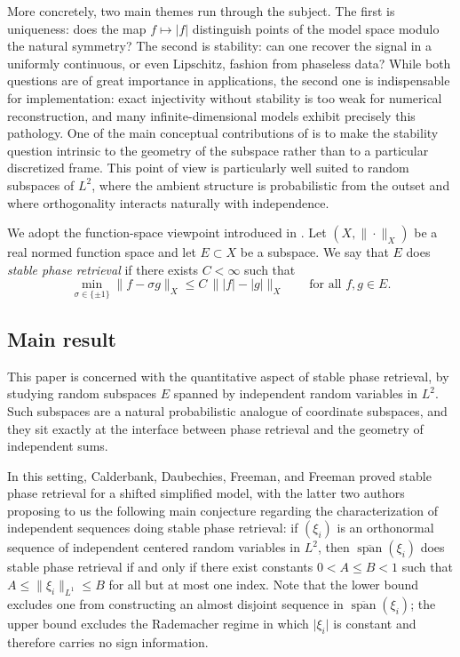 \documentclass[11pt]{amsart}
\numberwithin{equation}{section}
\theoremstyle{definition}
\theoremstyle{remark}
\newcommand{\Span}{\operatorname{span}}
\newcommand{\abs}[1]{\lvert #1 \rvert}
\newcommand{\norm}[1]{\lVert #1 \rVert}
\begin{document}
More concretely, two main themes run through the subject.  The first is uniqueness: does the map
$f\mapsto |f|$ distinguish points of the model space modulo the natural
symmetry?  The second is stability: can one recover the signal in a uniformly
continuous, or even Lipschitz, fashion from phaseless data?  While both questions are of great importance in applications,
the second one is indispensable for implementation:  exact injectivity without stability is
too weak for numerical reconstruction, and many infinite-dimensional models
exhibit precisely this pathology.  One of the main conceptual contributions of
\cite{calderbank2022stable,camunez2025characterization,christ2022examples,FOTP,garcia2025isometric,garcia2025existence} is to make the stability question intrinsic to the geometry of the
subspace rather than to a particular discretized frame.  This point of view is
particularly well suited to random subspaces of $L^2$, where the ambient
structure is probabilistic from the outset and where orthogonality interacts
naturally with independence. 

We adopt the function-space viewpoint introduced in
\cite{calderbank2022stable,FOTP}.  Let $(X,\|\cdot\|_X)$ be a real normed function space and let
$E\subset X$ be a subspace.  We say that $E$ does \emph{stable phase
retrieval} if there exists $C<\infty$ such that
\begin{equation}
\label{def:stable_pr}
\min_{\sigma\in\{\pm1\}}\norm{f-\sigma g}_X
\le C\,\norm{\abs{f}-\abs{g}}_X
\qquad\text{for all }f,g\in E.
\end{equation}
 
\subsection{Main result} This paper is concerned with the quantitative aspect of stable phase retrieval, by studying random subspaces $E$ spanned
by independent random variables in $L^2$. Such subspaces are a
natural probabilistic analogue of coordinate subspaces, and they sit exactly at
the interface between phase retrieval and the geometry of independent sums.  

In
this setting, Calderbank, Daubechies, Freeman, and Freeman
\cite{calderbank2022stable} proved stable phase retrieval for a shifted simplified model, with the latter two authors proposing to us the following main conjecture regarding the characterization of independent sequences doing stable phase retrieval: if $(\xi_i)$ is an orthonormal sequence of independent centered
random variables in $L^2$, then $\overline{\Span}(\xi_i)$ does stable phase
retrieval if and only if there exist constants $0<A\le B<1$ such that
$A\le \norm{\xi_i}_{L^1}\le B$ for all but at most one index.  Note that the lower bound
excludes one from constructing an almost disjoint sequence in $\overline{\Span}(\xi_i)$; the upper bound excludes the Rademacher
regime in which $\abs{\xi_i}$ is constant and therefore carries no sign
information.
\end{document}
